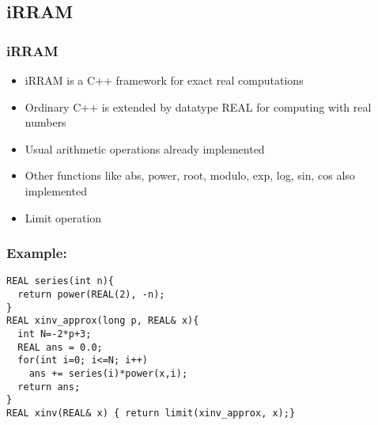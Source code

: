 \subsection{iRRAM}
\begin{frame}[<+->]
\frametitle{iRRAM}
\begin{itemize}[<+->]
\item iRRAM is a C++ framework for exact real computations
\item Ordinary C++ is extended by datatype REAL for computing with real numbers
\item Usual arithmetic operations already implemented
\item Other functions like abs, power, root, modulo, exp, log, sin, cos also implemented
\item Limit operation 
\end{itemize}
\end{frame}
\begin{frame}[<+->][fragile]
\frametitle{Example: \irram}
\begin{example}
\begin{lstlisting}
REAL series(int n){
  return power(REAL(2), -n);
}
REAL xinv_approx(long p, REAL& x){
  int N=-2*p+3;
  REAL ans = 0.0;
  for(int i=0; i<=N; i++)
    ans += series(i)*power(x,i);
  return ans;
}
REAL xinv(REAL& x) { return limit(xinv_approx, x);}
\end{lstlisting}
\end{example}
\end{frame}
